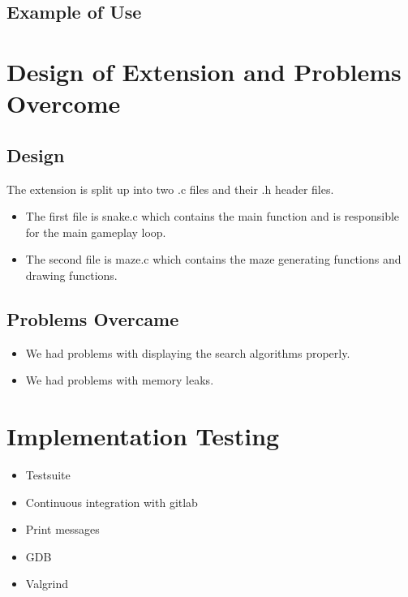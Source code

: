 \documentclass[11pt]{article}
\begin{document}
\subsection{Example of Use}


\graphicspath{ {./images/} }



\section{Design of Extension and Problems Overcome}

\subsection{Design}

The extension is split up into two .c files and their .h header files.
\begin{itemize}
    \item The first file is snake.c which contains the main function and is responsible for the main gameplay loop.
    \item The second file is maze.c which contains the maze generating functions and drawing functions.
\end{itemize}




\subsection{Problems Overcame}

\begin{itemize}
    \item We had problems with displaying the search algorithms properly.
    \item We had problems with memory leaks.
\end{itemize}

\section{Implementation Testing}

\begin{itemize}
    \item Testsuite
    \item Continuous integration with gitlab
    \item Print messages
    \item GDB
    \item Valgrind
\end{itemize}
\end{document}
